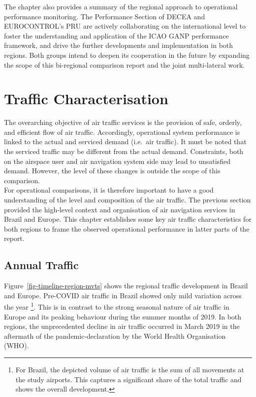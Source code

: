 \documentclass[
  a4paper,
  DIV=11,
  numbers=noendperiod]{scrreprt}
\begin{document}
The chapter also provides a summary of the regional approach to
operational performance monitoring. The Performance Section of DECEA and
EUROCONTROL's PRU are actively collaborating on the international level
to foster the understanding and application of the ICAO GANP performance
framework, and drive the further developments and implementation in both
regions. Both groups intend to deepen its cooperation in the future by
expanding the scope of this bi-regional comparison report and the joint
multi-lateral work.


\hypertarget{traffic-characterisation}{%
\chapter{Traffic Characterisation}\label{traffic-characterisation}}

The overarching objective of air traffic services is the provision of
safe, orderly, and efficient flow of air traffic. Accordingly,
operational system performance is linked to the actual and serviced
demand (i.e.~air traffic). It must be noted that the serviced traffic
may be different from the actual demand. Constraints, both on the
airspace user and air navigation system side may lead to unsatisfied
demand. However, the level of these changes is outside the scope of this
comparison.\\
For operational comparisons, it is therefore important to have a good
understanding of the level and composition of the air traffic. The
previous section provided the high-level context and organisation of air
navigation services in Brazil and Europe. This chapter establishes some
key air traffic characteristics for both regions to frame the observed
operational performance in latter parts of the report.

\hypertarget{annualtraffic}{%
\section{Annual Traffic}\label{annualtraffic}}

Figure~\ref{fig-timeline-region-mvts} shows the regional traffic
development in Brazil and Europe. Pre-COVID air traffic in Brazil showed
only mild variation across the year \footnote{For Brazil, the depicted
  volume of air traffic is the sum of all movements at the study
  airports. This captures a significant share of the total traffic and
  shows the overall development.}. This is in contrast to the strong
seasonal nature of air traffic in Europe and its peaking behaviour
during the summer months of 2019. In both regions, the unprecedented
decline in air traffic occurred in March 2019 in the aftermath of the
pandemic-declaration by the World Health Organisation (WHO).
\end{document}
